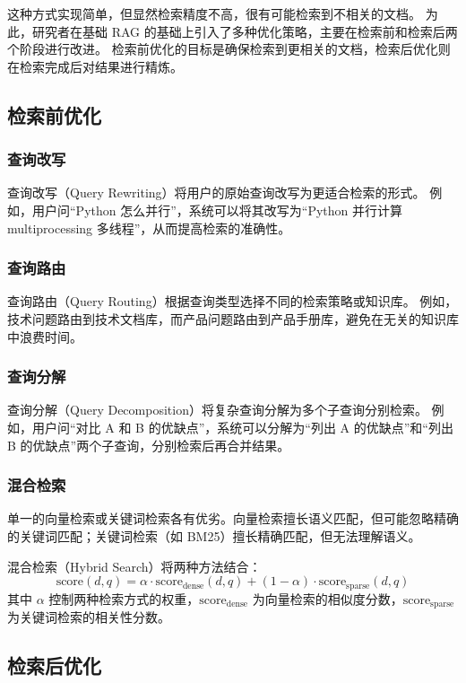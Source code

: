 这种方式实现简单，但显然检索精度不高，很有可能检索到不相关的文档。
为此，研究者在基础 RAG 的基础上引入了多种优化策略，主要在检索前和检索后两个阶段进行改进。
检索前优化的目标是确保检索到更相关的文档，检索后优化则在检索完成后对结果进行精炼。

\subsection{检索前优化}
\subsubsection{查询改写}
查询改写（Query Rewriting）将用户的原始查询改写为更适合检索的形式。
例如，用户问“Python 怎么并行”，系统可以将其改写为“Python 并行计算 multiprocessing 多线程”，从而提高检索的准确性。

\subsubsection{查询路由}
查询路由（Query Routing）根据查询类型选择不同的检索策略或知识库。
例如，技术问题路由到技术文档库，而产品问题路由到产品手册库，避免在无关的知识库中浪费时间。

\subsubsection{查询分解}
查询分解（Query Decomposition）将复杂查询分解为多个子查询分别检索。
例如，用户问“对比 A 和 B 的优缺点”，系统可以分解为“列出 A 的优缺点”和“列出 B 的优缺点”两个子查询，分别检索后再合并结果。

\subsubsection{混合检索}
单一的向量检索或关键词检索各有优劣。向量检索擅长语义匹配，但可能忽略精确的关键词匹配；关键词检索（如 BM25）擅长精确匹配，但无法理解语义。

混合检索（Hybrid Search）将两种方法结合：
\begin{equation*}
	\text{score}(d, q) = \alpha \cdot \text{score}_{\text{dense}}(d, q) + (1 - \alpha) \cdot \text{score}_{\text{sparse}}(d, q)
\end{equation*}
其中 $\alpha$ 控制两种检索方式的权重，$\text{score}_{\text{dense}}$ 为向量检索的相似度分数，$\text{score}_{\text{sparse}}$ 为关键词检索的相关性分数。

\subsection{检索后优化}
